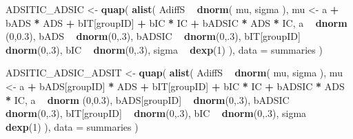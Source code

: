 \documentclass[10pt,dvipsnames,enabledeprecatedfontcommands]{scrartcl}
\newenvironment{Shaded}{\begin{snugshade}}{\end{snugshade}}
\newcommand{\DataTypeTok}[1]{\textcolor[rgb]{0.13,0.29,0.53}{#1}}
\newcommand{\DecValTok}[1]{\textcolor[rgb]{0.00,0.00,0.81}{#1}}
\newcommand{\FloatTok}[1]{\textcolor[rgb]{0.00,0.00,0.81}{#1}}
\newcommand{\KeywordTok}[1]{\textcolor[rgb]{0.13,0.29,0.53}{\textbf{#1}}}
\newcommand{\NormalTok}[1]{#1}
\newcommand{\OperatorTok}[1]{\textcolor[rgb]{0.81,0.36,0.00}{\textbf{#1}}}
\newcommand{\StringTok}[1]{\textcolor[rgb]{0.31,0.60,0.02}{#1}}
\begin{document}
\begin{Shaded}
\begin{Highlighting}[]
\NormalTok{ADSITIC_ADSIC <-}\StringTok{ }\KeywordTok{quap}\NormalTok{(}
  \KeywordTok{alist}\NormalTok{(}
\NormalTok{    AdiffS }\OperatorTok{~}\StringTok{ }\KeywordTok{dnorm}\NormalTok{( mu, sigma ),}
\NormalTok{    mu <-}\StringTok{ }\NormalTok{a }\OperatorTok{+}\StringTok{ }\NormalTok{bADS }\OperatorTok{*}\StringTok{ }\NormalTok{ADS }\OperatorTok{+}\StringTok{  }\NormalTok{bIT[groupID] }\OperatorTok{+}\StringTok{ }\NormalTok{bIC }\OperatorTok{*}\StringTok{ }\NormalTok{IC }\OperatorTok{+}\StringTok{ }\NormalTok{bADSIC }\OperatorTok{*}\StringTok{ }\NormalTok{ADS }\OperatorTok{*}\StringTok{ }\NormalTok{IC,}
\NormalTok{    a }\OperatorTok{~}\StringTok{ }\KeywordTok{dnorm}\NormalTok{ (}\DecValTok{0}\NormalTok{,}\FloatTok{0.3}\NormalTok{),}
\NormalTok{    bADS }\OperatorTok{~}\StringTok{ }\KeywordTok{dnorm}\NormalTok{(}\DecValTok{0}\NormalTok{,.}\DecValTok{3}\NormalTok{),}
\NormalTok{    bADSIC }\OperatorTok{~}\StringTok{ }\KeywordTok{dnorm}\NormalTok{(}\DecValTok{0}\NormalTok{,.}\DecValTok{3}\NormalTok{),}
\NormalTok{    bIT[groupID] }\OperatorTok{~}\StringTok{ }\KeywordTok{dnorm}\NormalTok{(}\DecValTok{0}\NormalTok{,.}\DecValTok{3}\NormalTok{),}
\NormalTok{    bIC }\OperatorTok{~}\StringTok{ }\KeywordTok{dnorm}\NormalTok{(}\DecValTok{0}\NormalTok{,.}\DecValTok{3}\NormalTok{),}
\NormalTok{    sigma  }\OperatorTok{~}\StringTok{ }\KeywordTok{dexp}\NormalTok{(}\DecValTok{1}\NormalTok{)}
\NormalTok{  ), }
  \DataTypeTok{data =}\NormalTok{ summaries}
\NormalTok{)}


\NormalTok{ADSITIC_ADSIC_ADSIT <-}\StringTok{ }\KeywordTok{quap}\NormalTok{(}
  \KeywordTok{alist}\NormalTok{(}
\NormalTok{    AdiffS }\OperatorTok{~}\StringTok{ }\KeywordTok{dnorm}\NormalTok{( mu, sigma ),}
\NormalTok{    mu <-}\StringTok{ }\NormalTok{a }\OperatorTok{+}\StringTok{ }\NormalTok{bADS[groupID] }\OperatorTok{*}\StringTok{ }\NormalTok{ADS }\OperatorTok{+}\StringTok{  }\NormalTok{bIT[groupID] }\OperatorTok{+}\StringTok{ }\NormalTok{bIC }\OperatorTok{*}\StringTok{ }\NormalTok{IC }\OperatorTok{+}\StringTok{ }\NormalTok{bADSIC }\OperatorTok{*}\StringTok{ }\NormalTok{ADS }\OperatorTok{*}\StringTok{ }\NormalTok{IC,}
\NormalTok{    a }\OperatorTok{~}\StringTok{ }\KeywordTok{dnorm}\NormalTok{ (}\DecValTok{0}\NormalTok{,}\FloatTok{0.3}\NormalTok{),}
\NormalTok{    bADS[groupID] }\OperatorTok{~}\StringTok{ }\KeywordTok{dnorm}\NormalTok{(}\DecValTok{0}\NormalTok{,.}\DecValTok{3}\NormalTok{),}
\NormalTok{    bADSIC }\OperatorTok{~}\StringTok{ }\KeywordTok{dnorm}\NormalTok{(}\DecValTok{0}\NormalTok{,.}\DecValTok{3}\NormalTok{),}
\NormalTok{    bIT[groupID] }\OperatorTok{~}\StringTok{ }\KeywordTok{dnorm}\NormalTok{(}\DecValTok{0}\NormalTok{,.}\DecValTok{3}\NormalTok{),}
\NormalTok{    bIC }\OperatorTok{~}\StringTok{ }\KeywordTok{dnorm}\NormalTok{(}\DecValTok{0}\NormalTok{,.}\DecValTok{3}\NormalTok{),}
\NormalTok{    sigma  }\OperatorTok{~}\StringTok{ }\KeywordTok{dexp}\NormalTok{(}\DecValTok{1}\NormalTok{)}
\NormalTok{  ), }
  \DataTypeTok{data =}\NormalTok{ summaries}
\NormalTok{)}



\end{Highlighting}
\end{Shaded}
\end{document}

